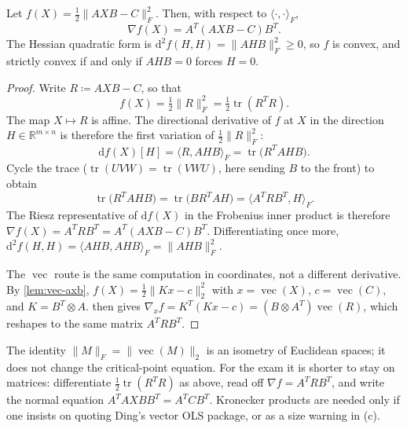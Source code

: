 \documentclass[11pt,a4paper]{article}
\begin{document}
\begin{lemma}
\label{lem:frob-grad}
Let \(f(X)=\tfrac12\|AXB-C\|_{F}^{2}\). Then, with respect to \(\langle\cdot,\cdot\rangle_{F}\),
\[
\nabla f(X)
=
A^{T}(AXB-C)B^{T}.
\]
The Hessian quadratic form is \(\mathrm{d}^{2}f(H,H)=\|AHB\|_{F}^{2}\ge 0\), so \(f\) is convex, and strictly convex if and only if \(AHB=0\) forces \(H=0\).
\end{lemma}

\begin{proof}
Write \(R\coloneqq AXB-C\), so that
\[
f(X)
=
\tfrac12\|R\|_{F}^{2}
=
\tfrac12\operatorname{tr}(R^{T}R).
\]
The map \(X\mapsto R\) is affine. The directional derivative of \(f\) at \(X\) in the direction \(H\in\mathbb{R}^{m\times n}\) is therefore the first variation of \(\tfrac12\|R\|_{F}^{2}\):
\[
\mathrm{d}f(X)[H]
=
\langle R,AHB\rangle_{F}
=
\operatorname{tr}\bigl(R^{T}AHB\bigr).
\]
Cycle the trace (\(\operatorname{tr}(UVW)=\operatorname{tr}(VWU)\), here sending \(B\) to the front) to obtain
\[
\operatorname{tr}\bigl(R^{T}AHB\bigr)
=
\operatorname{tr}\bigl(BR^{T}AH\bigr)
=
\langle A^{T}RB^{T},H\rangle_{F}.
\]
The Riesz representative of \(\mathrm{d}f(X)\) in the Frobenius inner product is therefore \(\nabla f(X)=A^{T}RB^{T}=A^{T}(AXB-C)B^{T}\). Differentiating once more, \(\mathrm{d}^{2}f(H,H)=\langle AHB,AHB\rangle_{F}=\|AHB\|_{F}^{2}\).

The \(\operatorname{vec}\) route is the same computation in coordinates, not a different derivative. By \cref{lem:vec-axb}, \(f(X)=\tfrac12\|Kx-c\|_{2}^{2}\) with \(x=\operatorname{vec}(X)\), \(c=\operatorname{vec}(C)\), and \(K=B^{T}\otimes A\).  then gives \(\nabla_{x}f=K^{T}(Kx-c)=(B\otimes A^{T})\operatorname{vec}(R)\), which reshapes to the same matrix \(A^{T}RB^{T}\).
\end{proof}

\begin{remark}
\label{rem:p3-trace}
The identity \(\|M\|_{F}=\|\operatorname{vec}(M)\|_{2}\) is an isometry of Euclidean spaces; it does not change the critical-point equation. For the exam it is shorter to stay on matrices: differentiate \(\tfrac12\operatorname{tr}(R^{T}R)\) as above, read off \(\nabla f=A^{T}RB^{T}\), and write the normal equation \(A^{T}AXBB^{T}=A^{T}CB^{T}\). Kronecker products are needed only if one insists on quoting Ding's vector OLS package, or as a size warning in (c).
\end{remark}
\end{document}
